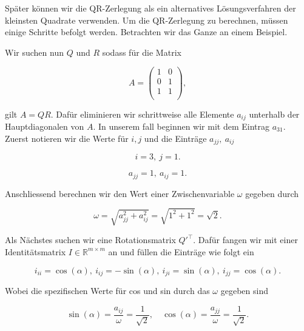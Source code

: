 Später können wir die QR-Zerlegung als ein alternatives Lösungsverfahren der kleinsten Quadrate verwenden. Um die QR-Zerlegung zu berechnen, müssen einige Schritte befolgt werden. Betrachten wir das Ganze an einem Beispiel.

\vspace{1\baselineskip}

Wir suchen nun \( Q \) und \( R \) sodass für die Matrix 

\begin{equation*}
    A = \begin{pmatrix}
        1 & 0 \\
        0 & 1 \\
        1 & 1 \\
    \end{pmatrix},
\end{equation*}

gilt \( A = QR \). Dafür eliminieren wir schrittweise alle Elemente \( a_{ij} \) unterhalb der Hauptdiagonalen von \( A \). In unserem fall beginnen wir mit dem Eintrag \( a_{31} \). Zuerst notieren wir die Werte für \( i, j \) und die Einträge \( a_{jj}, \ a_{ij} \) 

\begin{equation*}
    i = 3, \ j = 1. 
\end{equation*}

\begin{equation*}
    a_{jj} = 1, \ a_{ij} = 1.
\end{equation*}

Anschliessend berechnen wir den Wert einer Zwischenvariable \( \omega \) gegeben durch

\begin{equation*}
    \omega = \sqrt{a_{jj}^2 + a_{ij}^2} = \sqrt{1^2 + 1^2} = \sqrt{2}.
\end{equation*}

Als Nächstes suchen wir eine Rotationsmatrix \( Q'^\top \). Dafür fangen wir mit einer Identitätsmatrix \( I \in \mathbb{R}^{m \times m} \) an und füllen die Einträge wie folgt ein

\begin{equation*}
    i_{ii} = \cos(\alpha), \ i_{ij} = -\sin(\alpha), \ i_{ji} = \sin(\alpha), \ i_{jj} = \cos(\alpha).
\end{equation*}

Wobei die spezifischen Werte für cos und sin durch das \( \omega \) gegeben sind

\begin{equation*}
    \sin(\alpha) = \frac{a_{ij}}{\omega} = \frac{1}{\sqrt{2}}, \quad \cos(\alpha) = \frac{a_{jj}}{\omega} = \frac{1}{\sqrt{2}}.
\end{equation*}

